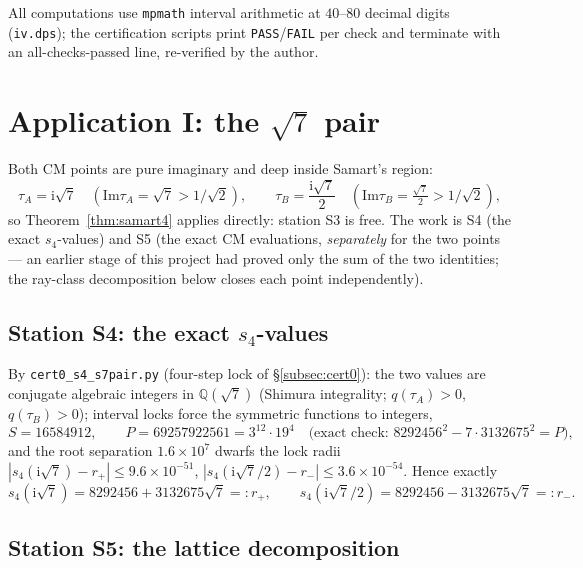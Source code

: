\documentclass[11pt]{article}
\newcommand{\Qq}{\mathbb{Q}}
\newcommand{\ii}{\mathrm{i}}
\newcommand{\ImT}{\mathrm{Im}}
\theoremstyle{definition}
\theoremstyle{remark}
\begin{document}
All computations use \texttt{mpmath} interval arithmetic at
$40$--$80$ decimal digits (\texttt{iv.dps}); the certification
scripts print \texttt{PASS}/\texttt{FAIL} per check and terminate
with an all-checks-passed line, re-verified by the author.

\section{Application I: the \texorpdfstring{$\sqrt7$}{sqrt7} pair}
\label{sec:app1}

Both CM points are pure imaginary and deep inside Samart's region:
\[
  \tau_A=\ii\sqrt7\quad(\ImT\tau_A=\sqrt7>1/\sqrt2),\qquad
  \tau_B=\frac{\ii\sqrt7}{2}\quad(\ImT\tau_B=\tfrac{\sqrt7}{2}>1/\sqrt2),
\]
so Theorem~\ref{thm:samart4} applies directly: station S3 is free.
The work is S4 (the exact $s_4$-values) and S5 (the exact CM
evaluations, \emph{separately} for the two points --- an earlier
stage of this project had proved only the sum of the two identities;
the ray-class decomposition below closes each point independently).

\subsection{Station S4: the exact \texorpdfstring{$s_4$}{s4}-values}

By \texttt{cert0\_s4\_s7pair.py} (four-step lock of
\S\ref{subsec:cert0}): the two values are conjugate algebraic
integers in $\Qq(\sqrt7)$ (Shimura integrality; $q(\tau_A)>0$,
$q(\tau_B)>0$); interval locks force the symmetric functions to
integers,
\[
  S=16584912,\qquad P=69257922561=3^{12}\cdot19^{4}
  \quad\bigl(\text{exact check: }8292456^2-7\cdot3132675^2=P\bigr),
\]
and the root separation $1.6\times10^{7}$ dwarfs the lock radii
$|s_4(\ii\sqrt7)-r_+|\le9.6\times10^{-51}$,
$|s_4(\ii\sqrt7/2)-r_-|\le3.6\times10^{-54}$. Hence exactly
\[
  s_4(\ii\sqrt7)=8292456+3132675\sqrt7=:r_+,\qquad
  s_4(\ii\sqrt7/2)=8292456-3132675\sqrt7=:r_- .
\]

\subsection{Station S5: the lattice decomposition}
\end{document}

